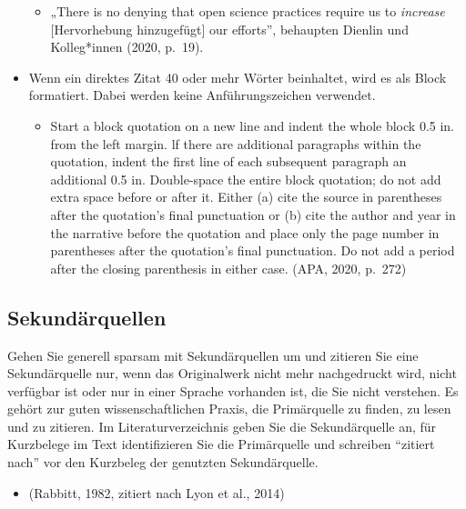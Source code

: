 \documentclass[
  letterpaper,
  DIV=11]{scrreprt}
\providecommand{\tightlist}{%
  \setlength{\itemsep}{0pt}\setlength{\parskip}{0pt}}\usepackage{longtable,booktabs,array}
\begin{document}
\begin{itemize}
  \begin{itemize}
  \tightlist
  \item
    „There is no denying that open science practices require us to
    \emph{increase} {[}Hervorhebung hinzugefügt{]} our efforts'',
    behaupten Dienlin und Kolleg*innen (2020, p.~19).
  \end{itemize}
\item
  Wenn ein direktes Zitat 40 oder mehr Wörter beinhaltet, wird es als
  Block formatiert. Dabei werden keine Anführungszeichen verwendet.

  \begin{itemize}
  \tightlist
  \item
    Start a block quotation on a new line and indent the whole block 0.5
    in. from the left margin. lf there are additional paragraphs within
    the quotation, indent the first line of each subsequent paragraph an
    additional 0.5 in. Double-space the entire block quotation; do not
    add extra space before or after it. Either (a) cite the source in
    parentheses after the quotation's final punctuation or (b) cite the
    author and year in the narrative before the quotation and place only
    the page number in parentheses after the quotation's final
    punctuation. Do not add a period after the closing parenthesis in
    either case. (APA, 2020, p.~272)
  \end{itemize}
\end{itemize}

\hypertarget{sekunduxe4rquellen}{%
\subsection{Sekundärquellen}\label{sekunduxe4rquellen}}

Gehen Sie generell sparsam mit Sekundärquellen um und zitieren Sie eine
Sekundärquelle nur, wenn das Originalwerk nicht mehr nachgedruckt wird,
nicht verfügbar ist oder nur in einer Sprache vorhanden ist, die Sie
nicht verstehen. Es gehört zur guten wissenschaftlichen Praxis, die
Primärquelle zu finden, zu lesen und zu zitieren. Im
Literaturverzeichnis geben Sie die Sekundärquelle an, für Kurzbelege im
Text identifizieren Sie die Primärquelle und schreiben ``zitiert nach''
vor den Kurzbeleg der genutzten Sekundärquelle.

\begin{itemize}
\tightlist
\item
  (Rabbitt, 1982, zitiert nach Lyon et al., 2014)
\end{itemize}
\end{document}
